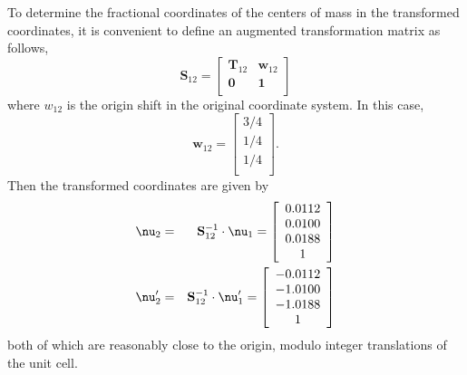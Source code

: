 \documentclass[preprint]{iucr}              %
\begin{document}
To determine the fractional coordinates of the centers of mass in the transformed coordinates, it is convenient to define an augmented transformation matrix as follows,
\begin{equation}
   \mathbf{S}_{12}=\left[
     \begin{array}{cc}
        \mathbf{T}_{12}& \mathbf{w}_{12}\\
        \mathbf{0}& \mathbf{1}\\
     \end{array}
  \right]
\end{equation}
where $w_{12}$ is the origin shift in the original coordinate system.  In this case,
\begin{equation}
   \mathbf{w}_{12}=\left[
     \begin{array}{c}
        3/4\\
        1/4\\
        1/4\\
     \end{array}
  \right].
\end{equation}
Then the transformed coordinates are given by 
\begin{eqnarray}
   \mbox{\boldmath$\nu$}_{2}&=&\mathbf{S}_{12}^{-1}\cdot
\mbox{\boldmath$\nu$}_{1}=\left[
     \begin{array}{c}
        0.0112\\
        0.0100\\
        0.0188\\
	1\\
     \end{array}
  \right]\\
   \mbox{\boldmath$\nu$}_{2}^\prime&=&\mathbf{S}_{12}^{-1}\cdot
\mbox{\boldmath$\nu$}_{1}^\prime=\left[
     \begin{array}{c}
        -0.0112\\
        -1.0100\\
       -1.0188\\
	1\\
     \end{array}
  \right]
\end{eqnarray}
both of which are reasonably close to the origin, modulo integer translations of the unit cell.
\end{document}
